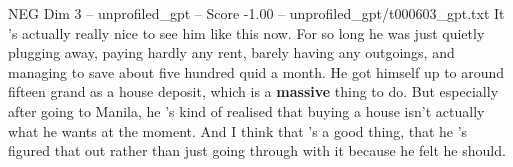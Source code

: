\begin{textsample}{NEG Dim 3 – unprofiled\_gpt – Score -1.00 – unprofiled\_gpt/t000603\_gpt.txt}  \label{ex:f3_neg_013}
It 's actually really nice to see him like this now.
For so long he was just quietly plugging away, paying hardly any rent, barely having any outgoings, and managing to save about five hundred quid a month.
He got himself up to around fifteen grand as a house deposit, which is a \textbf{massive} thing to do.
But especially after going to Manila, he ’s kind of realised that buying a house isn't actually what he wants at the moment.
And I think that ’s a good thing, that he ’s figured that out rather than just going through with it because he felt he should.

\end{textsample}
